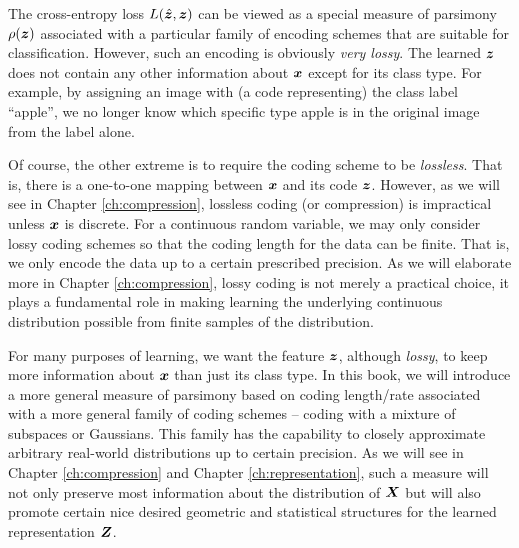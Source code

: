 \documentclass[../../book-main.tex]{subfiles}
\begin{document}
The cross-entropy loss $L(\hat {\bm{z}}, \bm{z})$ can be viewed as a special measure of parsimony $\rho(\bm{z})$ associated with a particular family of encoding schemes that are suitable for classification. However, such an encoding is obviously {\em very lossy}. The learned $\bm{z}$ does not contain any other information about $\bm{x}$ except for its class type. For example, by assigning an image with (a code representing) the class label ``apple'', we no longer know which specific type apple is in the original image from the label alone. 

Of course, the other extreme is to require the coding scheme to be {\em lossless}. That is, there is a one-to-one mapping between $\bm{x}$ and its code $\bm{z}$. However, as we will see in Chapter \ref{ch:compression},  lossless coding (or compression) is impractical unless $\bm{x}$ is discrete. For a continuous random variable, we may only consider lossy coding schemes so that the coding length for the data can be finite. That is, we only encode the data up to a certain prescribed precision. As we will elaborate more in Chapter \ref{ch:compression}, lossy coding is not merely a practical choice, it plays a fundamental role in making learning the underlying continuous distribution possible from finite samples of the distribution. 

For many purposes of learning, we want the feature $\bm{z}$, although {\em lossy}, to keep more information about $\bm{x}$ than just its class type. In this book, we will introduce a more general measure of parsimony based on coding length/rate associated with a more general family of coding schemes -- coding with a mixture of subspaces or Gaussians. This family has the capability to closely approximate arbitrary real-world distributions up to certain precision. As we will see in Chapter \ref{ch:compression} and Chapter \ref{ch:representation}, such a measure will not only preserve most information about the distribution of $\bm{X}$ but will also promote certain nice desired geometric and statistical structures for the learned representation $\bm{Z}$. 
\end{document}
